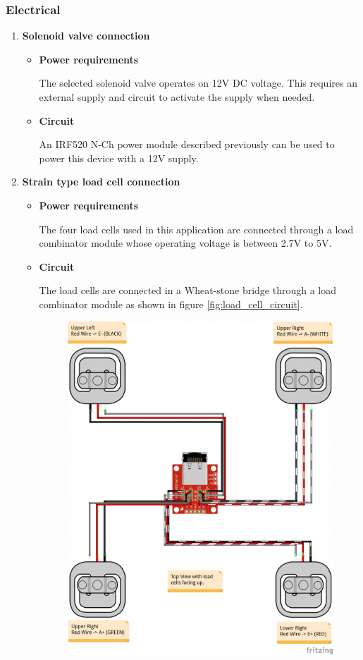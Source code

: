 \subsubsection{Electrical}
\begin{enumerate}
    \item \textbf{Solenoid valve connection}
    \par
    \begin{itemize}
        \item \textbf{Power requirements}
        \par
        The selected solenoid valve operates on 12V DC voltage. This requires an external supply and circuit to activate the supply when needed.
        \item \textbf{Circuit}
        \par
        An IRF520 N-Ch power module described previously can be used to power this device with a 12V supply.
    \end{itemize}
    \item \textbf{Strain type load cell connection}
    \par
    \begin{itemize}
        \item \textbf{Power requirements}
        \par
        The four load cells used in this application are connected through a load combinator module whose operating voltage is between 2.7V to 5V.
        \item \textbf{Circuit}
        \par
        The load cells are connected in a Wheat-stone bridge through a load combinator module as shown in figure \ref{fig:load_cell_circuit}.
        \begin{figure}[H]
            \centering
            \includegraphics[width=.65\textwidth, height=.65\textheight]{Figures/load_cell_combined.jpg}

\end{figure}
\end{itemize}
\end{enumerate}
